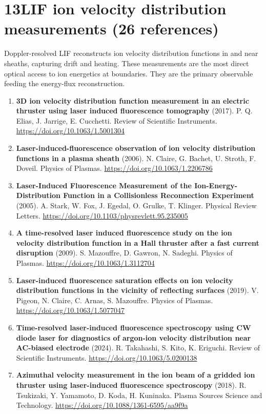 \documentclass[11pt,a4paper]{article}
\begin{document}
\section*{13\quad LIF ion velocity distribution measurements \textnormal{(\normalsize 26 references)}}
Doppler-resolved LIF reconstructs ion velocity distribution functions in and near sheaths, capturing drift and heating. These measurements are the most direct optical access to ion energetics at boundaries. They are the primary observable feeding the energy-flux reconstruction.
\begin{enumerate}[leftmargin=1.4em]
\item \textbf{3D ion velocity distribution function measurement in an electric thruster using laser induced fluorescence tomography} (2017). P. Q. Elias, J. Jarrige, E. Cucchetti. Review of Scientific Instruments. \url{https://doi.org/10.1063/1.5001304}
\item \textbf{Laser-induced-fluorescence observation of ion velocity distribution functions in a plasma sheath} (2006). N. Claire, G. Bachet, U. Stroth, F. Doveil. Physics of Plasmas. \url{https://doi.org/10.1063/1.2206786}
\item \textbf{Laser-Induced Fluorescence Measurement of the Ion-Energy-Distribution Function in a Collisionless Reconnection Experiment} (2005). A. Stark, W. Fox, J. Egedal, O. Grulke, T. Klinger. Physical Review Letters. \url{https://doi.org/10.1103/physrevlett.95.235005}
\item \textbf{A time-resolved laser induced fluorescence study on the ion velocity distribution function in a Hall thruster after a fast current disruption} (2009). S. Mazouffre, D. Gawron, N. Sadeghi. Physics of Plasmas. \url{https://doi.org/10.1063/1.3112704}
\item \textbf{Laser-induced fluorescence saturation effects on ion velocity distribution functions in the vicinity of reflecting surfaces} (2019). V. Pigeon, N. Claire, C. Arnas, S. Mazouffre. Physics of Plasmas. \url{https://doi.org/10.1063/1.5077047}
\item \textbf{Time-resolved laser-induced fluorescence spectroscopy using CW diode laser for diagnostics of argon-ion velocity distribution near AC-biased electrode} (2024). R. Takahashi, S. Kito, K. Eriguchi. Review of Scientific Instruments. \url{https://doi.org/10.1063/5.0200138}
\item \textbf{Azimuthal velocity measurement in the ion beam of a gridded ion thruster using laser-induced fluorescence spectroscopy} (2018). R. Tsukizaki, Y. Yamamoto, D. Koda, H. Kuninaka. Plasma Sources Science and Technology. \url{https://doi.org/10.1088/1361-6595/aa9f9a}

\end{enumerate}
\end{document}
